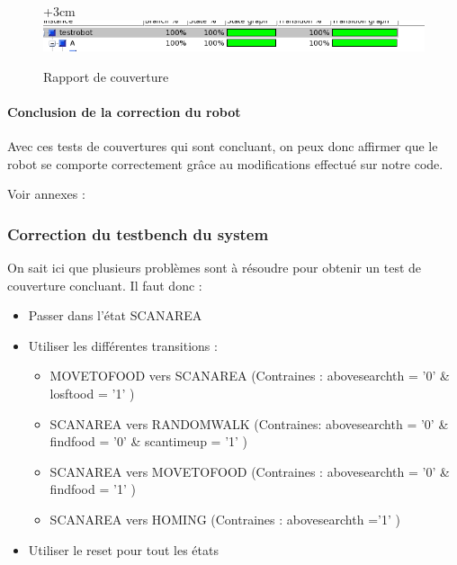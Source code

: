 \documentclass{article}
\begin{document}
\begin{figure}[!h]
\advance\leftskip+3cm
\includegraphics[scale=0.7]{PremiereCorrection/resultats.PNG}
\caption{Rapport de couverture}

\end{figure}

\paragraph{Conclusion de la correction du robot}
Avec ces tests de couvertures qui sont concluant, on peux donc affirmer que le robot se comporte correctement grâce au modifications effectué sur notre code.

Voir annexes : 

\subsubsection{Correction du testbench du system}

On sait ici que plusieurs problèmes sont à résoudre pour obtenir un test de couverture concluant. Il faut donc : 
\begin{itemize}
\item Passer dans l'état SCANAREA
\item Utiliser les différentes transitions :
	\begin{itemize}
	\item MOVETOFOOD vers SCANAREA (Contraines : abovesearchth = '0' \& losftood = '1' )
	\item SCANAREA vers RANDOMWALK (Contraines: abovesearchth = '0' \& findfood = '0' \& scantimeup = '1'  )
	\item SCANAREA vers MOVETOFOOD (Contraines : abovesearchth = '0' \& findfood = '1' )
	\item SCANAREA vers HOMING (Contraines : abovesearchth ='1' )
	\end{itemize}
\item Utiliser le reset pour tout les états
\end{itemize}
\end{document}
